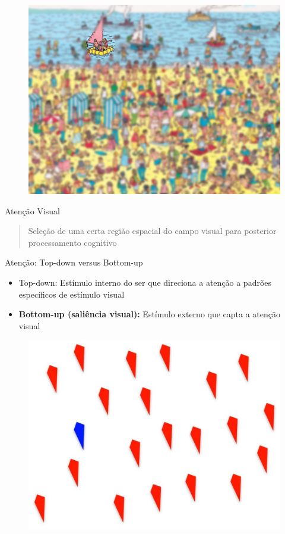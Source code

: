 \documentclass[10pt]{beamer}
\newcommand{\tbf}[1]{\textbf{#1}}
\begin{document}
\begin{frame}{}
    \begin{figure}
        \centering
        \includegraphics[width=0.9\linewidth]{./img/wheres_wally_focus_2.jpg}
    \end{figure}
\end{frame}

\begin{frame}{Atenção Visual}
    \begin{quote}
        Seleção de uma certa região espacial do campo visual para
        posterior processamento cognitivo
    \end{quote}
\end{frame}

\begin{frame}{Atenção: Top-down versus Bottom-up}
    \begin{itemize}[<+->]
        \item Top-down: Estímulo interno do ser que direciona a atenção
            a padrões específicos de estímulo visual
        \item \tbf{Bottom-up (saliência visual):}
            Estímulo externo que capta a atenção visual
    \end{itemize}
\end{frame}

\begin{frame}{}
    \begin{figure}
        \centering
        \includegraphics[width=0.8\linewidth]{./img/syntheticData2.jpg}
    \end{figure}
\end{frame}
\end{document}
